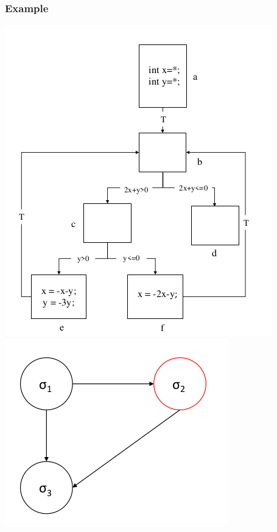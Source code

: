 \documentclass[11pt]{beamer}
\begin{document}
\begin{frame}\frametitle{Example}
\begin{center}
\includegraphics[scale=0.37]{1cfg.png}
\includegraphics[scale=0.3]{1pda.png}
\end{center}
\end{frame}
\end{document}

